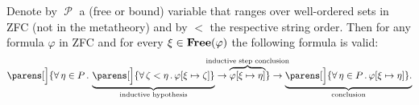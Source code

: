 \begin{theorem}\label{thm:well_ordered_induction}
  Denote by \( \mscrP \) a (free or bound) variable that ranges over well-ordered sets in ZFC (not in the metatheory) and by \( < \) the respective string order. Then for any formula \( \varphi \) in ZFC and for every \( \xi \in \operatorname{\mathbf{Free}}(\varphi) \) the following formula is valid:
  \begin{equation}\label{eq:thm:well_ordered_induction}
    \parens[\Big]
      {
        \qforall {\eta \in P}
          \underbrace
            {
              \parens[\Big] { \qforall {\zeta < \eta} \varphi[\xi \mapsto \zeta] }
            }_{\T{inductive hypothesis}}
        \rightarrow
        \overbrace{ \varphi[\xi \mapsto \eta] }^{\mathclap{\T{inductive step conclusion}}}
      }
    \rightarrow
    \underbrace
      {
        \parens[\Big]{ \qforall {\eta \in P} \varphi[\xi \mapsto \eta] }.
      }_{\T{conclusion}}
  \end{equation}
\end{theorem}
